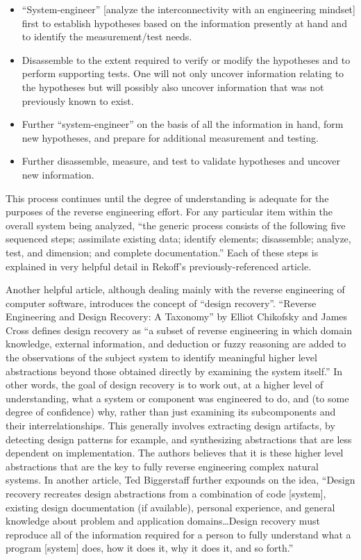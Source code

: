 \begin{itemize}
\item 
“System-engineer” [analyze the interconnectivity with an engineering
mindset] first to establish hypotheses based on the information
presently at hand and to identify the measurement/test needs.
\item 
Disassemble to the extent required to verify or modify the hypotheses
and to perform supporting tests. One will not only uncover information
relating to the hypotheses but will possibly also uncover information
that was not previously known to exist.
\item 
Further “system-engineer” on the basis of all the information in hand,
form new hypotheses, and prepare for additional measurement and
testing.
\item 
Further disassemble, measure, and test to validate hypotheses and
uncover new information.
\end{itemize}

This process continues until the degree of understanding is adequate for
the purposes of the reverse engineering effort. For any particular item
within the overall system being analyzed, “the generic process consists
of the following five sequenced steps; assimilate existing data;
identify elements; disassemble; analyze, test, and dimension; and
complete documentation.” Each of these steps is explained in very
helpful detail in Rekoff’s previously-referenced article.


Another helpful article, although dealing mainly with the reverse
engineering of computer software, introduces the concept of “design
recovery”. “Reverse Engineering and Design Recovery: A Taxonomy” by
Elliot Chikofsky and James Cross defines design recovery as “a subset
of reverse engineering in which domain knowledge, external information,
and deduction or fuzzy reasoning are added to the observations of the
subject system to identify meaningful higher level abstractions beyond
those obtained directly by examining the system
itself.”\citep{chikofskycross1990}
In other words, the goal of design
recovery is to work out, at a higher level of understanding, what a
system or component was engineered to do, and (to some degree of
confidence) why, rather than just examining its subcomponents and their
interrelationships. This generally involves extracting design
artifacts, by detecting design patterns for example, and synthesizing
abstractions that are less dependent on implementation. The authors
believes that it is these higher level abstractions that are the key to
fully reverse engineering complex natural systems. In another article,
Ted Biggerstaff further expounds on the idea, “Design recovery
recreates design abstractions from a combination of code [system],
existing design documentation (if available), personal experience, and
general knowledge about problem and application domains…Design recovery
must reproduce all of the information required for a person to fully
understand what a program [system] does, how it does it, why it does
it, and so forth.”\citep{biggerstaff1989}

